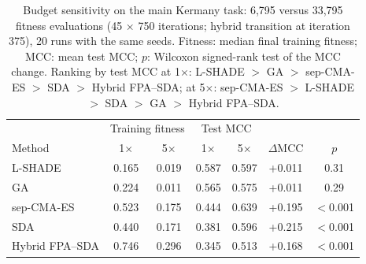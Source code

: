 \begin{table}[!t]
\centering
\caption{Budget sensitivity on the main Kermany task: 6,795 versus 33,795 fitness evaluations (45 $\times$ 750 iterations; hybrid transition at iteration 375), 20 runs with the same seeds. Fitness: median final training fitness; MCC: mean test MCC; $p$: Wilcoxon signed-rank test of the MCC change. Ranking by test MCC at 1$\times$: L-SHADE $>$ GA $>$ sep-CMA-ES $>$ SDA $>$ Hybrid FPA--SDA; at 5$\times$: sep-CMA-ES $>$ L-SHADE $>$ SDA $>$ GA $>$ Hybrid FPA--SDA.}
\label{tab:budget}
\footnotesize
\setlength{\tabcolsep}{3pt}
\begin{tabular}{lcccccc}
\toprule
 & \multicolumn{2}{c}{Training fitness} & \multicolumn{2}{c}{Test MCC} & & \\
Method & 1$\times$ & 5$\times$ & 1$\times$ & 5$\times$ & $\Delta$MCC & $p$ \\
\midrule
L-SHADE & 0.165 & 0.019 & 0.587 & 0.597 & +0.011 & 0.31 \\
GA & 0.224 & 0.011 & 0.565 & 0.575 & +0.011 & 0.29 \\
sep-CMA-ES & 0.523 & 0.175 & 0.444 & 0.639 & +0.195 & $<$0.001 \\
SDA & 0.440 & 0.171 & 0.381 & 0.596 & +0.215 & $<$0.001 \\
Hybrid FPA--SDA & 0.746 & 0.296 & 0.345 & 0.513 & +0.168 & $<$0.001 \\
\bottomrule
\end{tabular}
\end{table}
